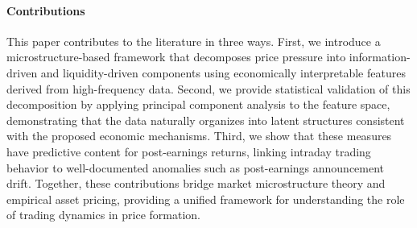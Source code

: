 \paragraph{Contributions}
This paper contributes to the literature in three ways.
First, we introduce a microstructure-based framework that decomposes price pressure into information-driven and liquidity-driven components using economically interpretable features derived from high-frequency data.
Second, we provide statistical validation of this decomposition by applying principal component analysis to the feature space, demonstrating that the data naturally organizes into latent structures consistent with the proposed economic mechanisms.
Third, we show that these measures have predictive content for post-earnings returns, linking intraday trading behavior to well-documented anomalies such as post-earnings announcement drift.
Together, these contributions bridge market microstructure theory and empirical asset pricing, providing a unified framework for understanding the role of trading dynamics in price formation.
